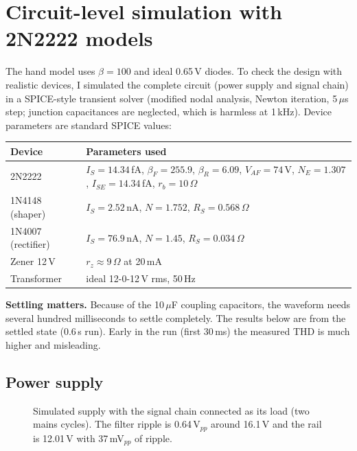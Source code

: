 \section{Circuit-level simulation with 2N2222 models}
\label{sec:sim}
The hand model uses $\beta=100$ and ideal 0.65\,V diodes. To check the design with realistic devices, I simulated the complete circuit (power supply and signal chain) in a SPICE-style transient solver (modified nodal analysis, Newton iteration, 5\,$\mu$s step; junction capacitances are neglected, which is harmless at 1\,kHz). Device parameters are standard SPICE values:
\begin{center}
\small
\begin{tabular}{@{}ll@{}}
\toprule
Device & Parameters used \\
\midrule
2N2222 & $I_S=14.34$\,fA, $\beta_F=255.9$, $\beta_R=6.09$, $V_{AF}=74$\,V, $N_E=1.307$, $I_{SE}=14.34$\,fA, $r_b=10\,\Omega$ \\
1N4148 (shaper) & $I_S=2.52$\,nA, $N=1.752$, $R_S=0.568\,\Omega$ \\
1N4007 (rectifier) & $I_S=76.9$\,nA, $N=1.45$, $R_S=0.034\,\Omega$ \\
Zener 12\,V & $r_z\approx9\,\Omega$ at 20\,mA \\
Transformer & ideal 12-0-12\,V rms, 50\,Hz \\
\bottomrule
\end{tabular}
\end{center}
\textbf{Settling matters.} Because of the 10\,$\mu$F coupling capacitors, the waveform needs several hundred milliseconds to settle completely. The results below are from the settled state (0.6\,s run). Early in the run (first 30\,ms) the measured THD is much higher and misleading.

\subsection{Power supply}
\begin{figure}[H]
\centering
{}
\caption{Simulated supply with the signal chain connected as its load (two mains cycles). The filter ripple is 0.64\,V$_{pp}$ around 16.1\,V and the rail is 12.01\,V with 37\,mV$_{pp}$ of ripple.}
\end{figure}

